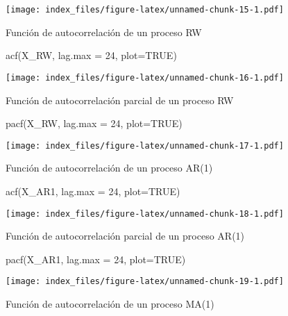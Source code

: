 \documentclass[
]{book}
\newenvironment{Shaded}{\begin{snugshade}}{\end{snugshade}}
\newcommand{\AttributeTok}[1]{\textcolor[rgb]{0.77,0.63,0.00}{#1}}
\newcommand{\ConstantTok}[1]{\textcolor[rgb]{0.00,0.00,0.00}{#1}}
\newcommand{\DecValTok}[1]{\textcolor[rgb]{0.00,0.00,0.81}{#1}}
\newcommand{\FunctionTok}[1]{\textcolor[rgb]{0.00,0.00,0.00}{#1}}
\newcommand{\NormalTok}[1]{#1}
\begin{document}
\texttt{[image: index\_files/figure-latex/unnamed-chunk-15-1.pdf]}

Función de autocorrelación de un proceso RW

\begin{Shaded}
\begin{Highlighting}[]
\FunctionTok{acf}\NormalTok{(X\_RW, }\AttributeTok{lag.max =} \DecValTok{24}\NormalTok{, }\AttributeTok{plot=}\ConstantTok{TRUE}\NormalTok{)}
\end{Highlighting}
\end{Shaded}

\texttt{[image: index\_files/figure-latex/unnamed-chunk-16-1.pdf]}

Función de autocorrelación parcial de un proceso RW

\begin{Shaded}
\begin{Highlighting}[]
\FunctionTok{pacf}\NormalTok{(X\_RW, }\AttributeTok{lag.max =} \DecValTok{24}\NormalTok{, }\AttributeTok{plot=}\ConstantTok{TRUE}\NormalTok{)}
\end{Highlighting}
\end{Shaded}

\texttt{[image: index\_files/figure-latex/unnamed-chunk-17-1.pdf]}

Función de autocorrelación de un proceso AR(1)

\begin{Shaded}
\begin{Highlighting}[]
\FunctionTok{acf}\NormalTok{(X\_AR1, }\AttributeTok{lag.max =} \DecValTok{24}\NormalTok{, }\AttributeTok{plot=}\ConstantTok{TRUE}\NormalTok{)}
\end{Highlighting}
\end{Shaded}

\texttt{[image: index\_files/figure-latex/unnamed-chunk-18-1.pdf]}

Función de autocorrelación parcial de un proceso AR(1)

\begin{Shaded}
\begin{Highlighting}[]
\FunctionTok{pacf}\NormalTok{(X\_AR1, }\AttributeTok{lag.max =} \DecValTok{24}\NormalTok{, }\AttributeTok{plot=}\ConstantTok{TRUE}\NormalTok{)}
\end{Highlighting}
\end{Shaded}

\texttt{[image: index\_files/figure-latex/unnamed-chunk-19-1.pdf]}

Función de autocorrelación de un proceso MA(1)
\end{document}
